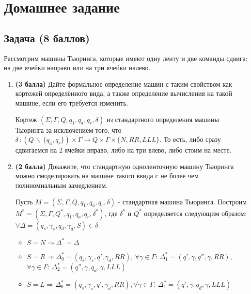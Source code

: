 \section{Домашнее задание}


\subsection{Задача \textbf{(8 баллов)}}

Рассмотрим машины Тьюринга, которые имеют одну ленту и две команды сдвига: на две ячейки направо или на три ячейки налево.

\begin{enumerate}
    \item \textbf{(3 балла)} Дайте формальное определение машин с таким свойством как кортежей определённого вида, а также определение вычисления на такой машине, если его требуется изменить.
          \begin{solution}
              Кортеж $(\Sigma, \Gamma, Q, q_1, q_a, q_r, \delta)$ из стандартного определения машины Тьюринга за исключением того, что $\delta \,: \left(Q \, \backslash \, \{q_a, q_r\} \right) \times \Gamma \rightarrow Q \times \Gamma \times \{N, RR, LLL\} $. То есть, либо сразу сдвигаемся на 2 ячейки вправо, либо на три влево, либо стоим на месте.
          \end{solution}
    \item \textbf{(2 балла)} Докажите, что стандартную одноленточную машину Тьюринга можно смоделировать на машине такого ввида с не более чем полиномиальным замедлением.
          \begin{solution}
              Пусть $M = (\Sigma, \Gamma, Q, q_1, q_a, q_r, \delta)$ - стандартная машина Тьюринга. Построим $M^* = (\Sigma, \Gamma, Q^*, q_1, q_a, q_r, \delta^*)$, где $\delta^*$ и $Q^*$ определяется следующим образом: $\forall \Delta = (q_s, \gamma_s, q_d, \gamma_d, S) \in \delta$
              \begin{itemize}
                  \item $S = N \Rightarrow \Delta^* = \Delta$
                  \item $S = R \Rightarrow \Delta_0^* = (q_s, \gamma_s, q', \gamma_d, RR)$, $\forall \gamma \in \Gamma: \, \Delta_1^* = (q', \gamma, q'', \gamma, RR)$, $\forall \gamma \in \Gamma: \, \Delta_2^* = (q'', \gamma, q_d, \gamma, LLL)$
                  \item $S = L \Rightarrow \Delta_0^* = (q_s, \gamma_s, q', \gamma_d, RR), \forall \gamma \in \Gamma: \, \Delta_1^* = (q', \gamma, q_d, \gamma, LLL)$

\end{itemize}
\end{solution}
\end{enumerate}
